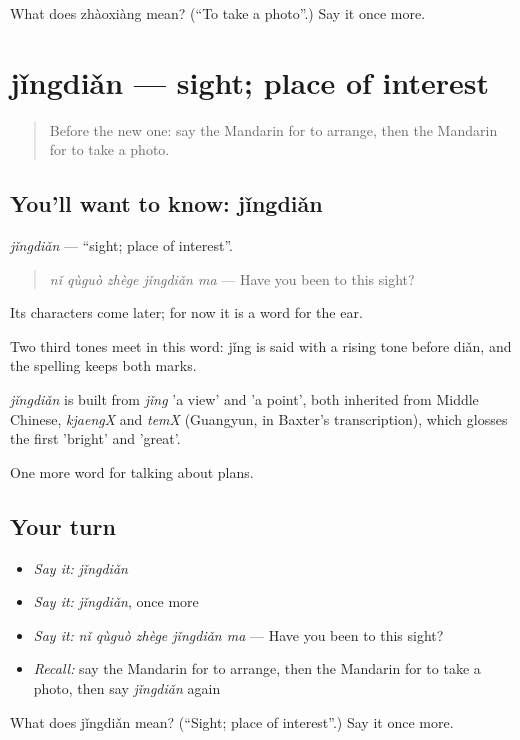 \begin{tcolorbox}[breakable,colback=teal!4,colframe=teal!35!black,title={Before you move on}]
What does zhàoxiàng mean? (\textquotedblleft{}To take a photo\textquotedblright{}.) Say it once more.
\end{tcolorbox}
\section[jǐngdiǎn]{jǐngdiǎn — sight; place of interest}

\label{lesson:ZH-C207-jingdian}



\begin{quote}
Before the new one: say the Mandarin for to arrange, then the Mandarin for to take a photo.
\end{quote}

\subsection*{You'll want to know: jǐngdiǎn}
\emph{jǐngdiǎn} — \textquotedblleft{}sight; place of interest\textquotedblright{}.

\begin{quote}
\emph{nǐ qùguò zhège jǐngdiǎn ma} — Have you been to this sight?
\end{quote}

Its characters come later; for now it is a word for the ear.

Two third tones meet in this word: jǐng is said with a rising tone before diǎn, and the spelling keeps both marks.

\begin{cousinweb}
\emph{jǐngdiǎn} is built from \emph{jǐng} 'a view' and  'a point', both inherited from Middle Chinese, \emph{kjaengX} and \emph{temX} (Guangyun, in Baxter's transcription), which glosses the first 'bright' and 'great'.
\end{cousinweb}

\begin{grammarlens}[title={What you've built}]
One more word for talking about plans.
\end{grammarlens}

\subsection*{Your turn}
\begin{itemize}
\raggedright
  \item \emph{Say it:} \emph{jǐngdiǎn}
  \item \emph{Say it:} \emph{jǐngdiǎn}, once more
  \item \emph{Say it:} \emph{nǐ qùguò zhège jǐngdiǎn ma} — Have you been to this sight?
  \item \emph{Recall:} say the Mandarin for to arrange, then the Mandarin for to take a photo, then say \emph{jǐngdiǎn} again
\end{itemize}

\begin{tcolorbox}[breakable,colback=teal!4,colframe=teal!35!black,title={Before you move on}]
What does jǐngdiǎn mean? (\textquotedblleft{}Sight; place of interest\textquotedblright{}.) Say it once more.
\end{tcolorbox}
